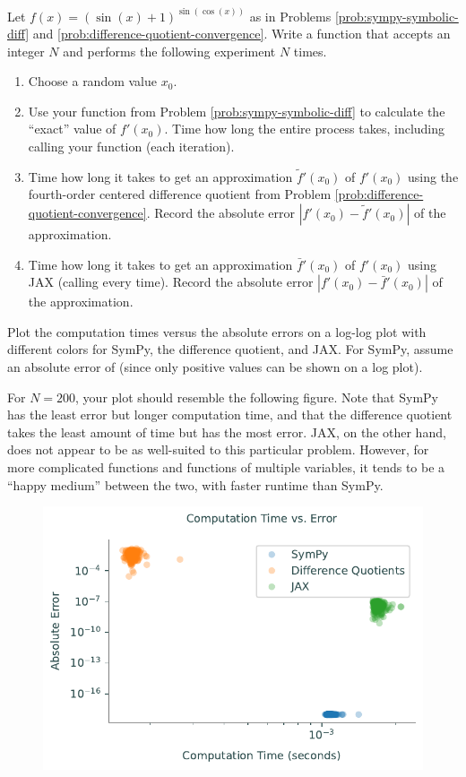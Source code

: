 \begin{problem} %
Let $f(x) = (\sin(x) + 1)^{\sin(\cos(x))}$ as in Problems \ref{prob:sympy-symbolic-diff} and \ref{prob:difference-quotient-convergence}.
Write a function that accepts an integer $N$ and performs the following experiment $N$ times.
\begin{enumerate}
\item Choose a random value $x_0$.
\item Use your function from Problem \ref{prob:sympy-symbolic-diff} to calculate the ``exact'' value of $f'(x_0)$.
Time how long the entire process takes, including calling your function (each iteration).
\item Time how long it takes to get an approximation $\tilde{f}'(x_0)$ of $f'(x_0)$ using the fourth-order centered difference quotient from Problem \ref{prob:difference-quotient-convergence}.
Record the absolute error $|f'(x_0) - \tilde{f}'(x_0)|$ of the approximation.
\item Time how long it takes to get an approximation $\bar{f}'(x_0)$ of $f'(x_0)$ using JAX (calling  every time).
Record the absolute error $|f'(x_0) - \bar{f}'(x_0)|$ of the approximation.
\end{enumerate}

Plot the computation times versus the absolute errors on a log-log plot with different colors for SymPy, the difference quotient, and JAX.
For SymPy, assume an absolute error of  (since only positive values can be shown on a log plot).

For $N=200$, your plot should resemble the following figure.
Note that SymPy has the least error but longer computation time, and that the difference quotient takes the least amount of time but has the most error.
JAX, on the other hand, does not appear to be as well-suited to this particular problem.
However, for more complicated functions and functions of multiple variables, it tends to be a ``happy medium'' between the two, with faster runtime than SymPy.

\begin{figure}[H]
    \includegraphics[width=.6\textwidth]{figures/efficiency.pdf}
\end{figure}
\end{problem}

